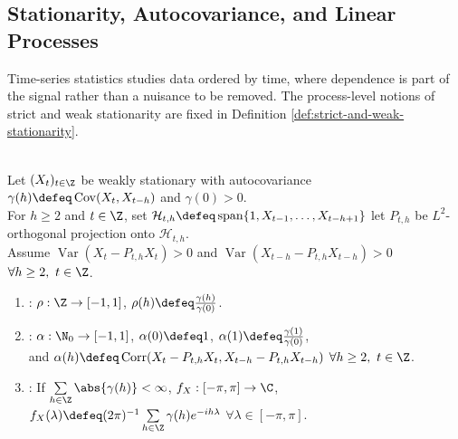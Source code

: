\subsection{Stationarity, Autocovariance, and Linear Processes}

Time-series statistics studies data ordered by time, where dependence is part of the signal rather than a nuisance to be removed.
The process-level notions of strict and weak stationarity are fixed in Definition \ref{def:strict-and-weak-stationarity}.

\begin{definition} \label{def:acf-pacf-and-spectral-density} \\
Let $(X_t)_{t\in\Z}$ be weakly stationary with autocovariance $\gamma(h)\defeq\operatorname{Cov}(X_t,X_{t-h})$ and $\gamma(0)>0$.\\
For $h\geq2$ and $t\in\Z$, set $\mathcal{H}_{t,h}\defeq\operatorname{span}\{1,X_{t-1},\ldots,X_{t-h+1}\}$ let $P_{t,h}$ be $L^2$-orthogonal projection onto $\mathcal{H}_{t,h}$.\\
Assume $\operatorname{Var}(X_t-P_{t,h}X_t)>0$ and $\operatorname{Var}(X_{t-h}-P_{t,h}X_{t-h})>0$ $\forall h\geq2,\ t\in\Z$.
\begin{enumerate}[label=(\roman*)]
\setlength{\itemsep}{0pt}
\item {}: $\rho:\Z\to[-1,1]$, $\rho(h)\defeq\frac{\gamma(h)}{\gamma(0)}$.
\item {}: $\alpha:\N_0\to[-1,1]$, $\alpha(0)\defeq1$, $\alpha(1)\defeq\frac{\gamma(1)}{\gamma(0)}$,\\
and $\alpha(h)\defeq\operatorname{Corr}(X_t-P_{t,h}X_t,X_{t-h}-P_{t,h}X_{t-h})$ $\forall h\geq2,\ t\in\Z$.
\item {}: If $\sum\limits_{h\in\Z}\abs{\gamma(h)}<\infty$, $f_X:[-\pi,\pi]\to\C$, $f_X(\lambda)\defeq(2\pi)^{-1}\sum\limits_{h\in\Z}\gamma(h)e^{-ih\lambda}$ $\forall\lambda\in[-\pi,\pi]$.
\end{enumerate}
\end{definition}

